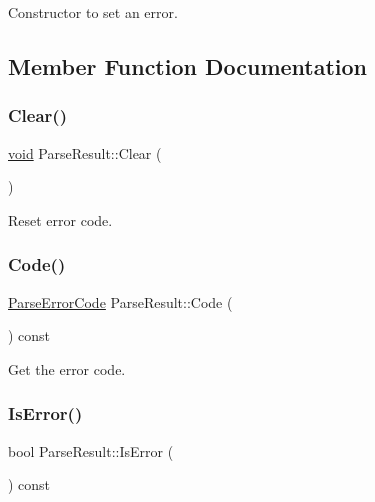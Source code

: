 Constructor to set an error. 



\subsection{Member Function Documentation}
\mbox{\label{structParseResult_a88b6d44f052a19e6436ae6aadc2c40b4}} 
\subsubsection{\texorpdfstring{Clear()}{Clear()}}
{\footnotesize\ttfamily \hyperlink{imgui__impl__opengl3__loader_8h_ac668e7cffd9e2e9cfee428b9b2f34fa7}{void} Parse\+Result\+::\+Clear (\begin{DoxyParamCaption}{ }\end{DoxyParamCaption})\hspace{0.3cm}{\ttfamily [inline]}}



Reset error code. 

\mbox{\label{structParseResult_a2aae3c2f42b31cc2409ee1e03bc4852e}} 
\subsubsection{\texorpdfstring{Code()}{Code()}}
{\footnotesize\ttfamily \hyperlink{group__RAPIDJSON__ERRORS_ga8d4b32dfc45840bca189ade2bbcb6ba7}{Parse\+Error\+Code} Parse\+Result\+::\+Code (\begin{DoxyParamCaption}{ }\end{DoxyParamCaption}) const\hspace{0.3cm}{\ttfamily [inline]}}



Get the error code. 

\mbox{\label{structParseResult_adfe0ef5b994e82f8aa9ebf0b30c924b1}} 
\subsubsection{\texorpdfstring{Is\+Error()}{IsError()}}
{\footnotesize\ttfamily bool Parse\+Result\+::\+Is\+Error (\begin{DoxyParamCaption}{ }\end{DoxyParamCaption}) const\hspace{0.3cm}{\ttfamily [inline]}}



